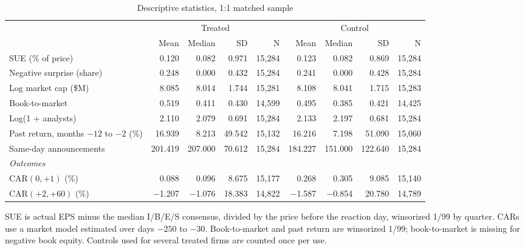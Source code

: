 \begin{table}[htbp]
\centering
\small
\setlength{\tabcolsep}{3.5pt}
\caption{Descriptive statistics, 1:1 matched sample}
\label{tab:descriptives}
\begin{tabular}{lrrrrrrrr}
\toprule
 & \multicolumn{4}{c}{Treated} & \multicolumn{4}{c}{Control} \\
\cmidrule(lr){2-5} \cmidrule(lr){6-9}
 & Mean & Median & SD & N & Mean & Median & SD & N \\
\midrule
SUE (\% of price) & 0.120 & 0.082 & 0.971 & 15,284 & 0.123 & 0.082 & 0.869 & 15,284 \\
Negative surprise (share) & 0.248 & 0.000 & 0.432 & 15,284 & 0.241 & 0.000 & 0.428 & 15,284 \\
Log market cap (\$M) & 8.085 & 8.014 & 1.744 & 15,281 & 8.108 & 8.041 & 1.715 & 15,283 \\
Book-to-market & 0.519 & 0.411 & 0.430 & 14,599 & 0.495 & 0.385 & 0.421 & 14,425 \\
Log(1 + analysts) & 2.110 & 2.079 & 0.691 & 15,284 & 2.133 & 2.197 & 0.681 & 15,284 \\
Past return, months $-12$ to $-2$ (\%) & 16.939 & 8.213 & 49.542 & 15,132 & 16.216 & 7.198 & 51.090 & 15,060 \\
Same-day announcements & 201.419 & 207.000 & 70.612 & 15,284 & 184.227 & 151.000 & 122.640 & 15,284 \\
\midrule \multicolumn{9}{l}{\emph{Outcomes}} \\
CAR$(0,+1)$ (\%) & 0.088 & 0.096 & 8.675 & 15,177 & 0.268 & 0.305 & 9.085 & 15,140 \\
CAR$(+2,+60)$ (\%) & $-$1.207 & $-$1.076 & 18.383 & 14,822 & $-$1.587 & $-$0.854 & 20.780 & 14,789 \\
\bottomrule
\end{tabular}
\par\medskip
\parbox{0.95\linewidth}{\footnotesize SUE is actual EPS minus the median I/B/E/S consensus, divided by the price before the reaction day, winsorized 1/99 by quarter. CARs use a market model estimated over days $-250$ to $-30$. Book-to-market and past return are winsorized 1/99; book-to-market is missing for negative book equity. Controls used for several treated firms are counted once per use.}
\end{table}
